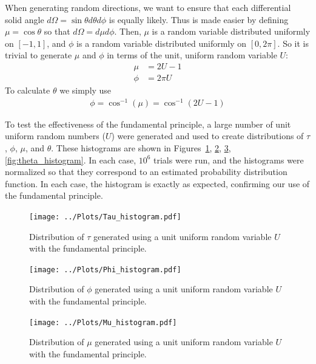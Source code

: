 \documentclass[twocolumn]{myarticle}
\begin{document}
When generating random directions, we want to ensure that each differential solid angle $ d \Omega = \sin \theta d \theta d \phi $ is equally likely.
Thus is made easier by defining $ \mu = \cos \theta $ so that $ d \Omega = d \mu d \phi $.
Then, $ \mu $ is a random variable distributed uniformly on $ [-1, 1] $, and $ \phi $ is a random variable distributed uniformly on $ [0, 2\pi] $.
So it is trivial to generate $ \mu $ and $ \phi $ in terms of the unit, uniform random variable $ U $:
\begin{align}
    \mu &= 2U - 1
    \\
    \phi &= 2\pi U
\end{align}
To calculate $ \theta $ we simply use
\begin{align}
    \phi = \cos^{-1} (\mu) = \cos^{-1}(2U-1) 
\end{align}

To test the effectiveness of the fundamental principle, a large number of unit uniform random numbers ($ U $) were generated and used to create distributions of $ \tau $, $ \phi $, $ \mu $, and $ \theta $.
These histograms are shown in Figures~\ref{fig:tau_histogram}, \ref{fig:phi_histogram}, \ref{fig:mu_histogram}, \ref{fig:theta_histogram}.
In each case, $ 10^6 $ trials were run, and the histograms were normalized so that they correspond to an estimated probability distribution function.
In each case, the histogram is exactly as expected, confirming our use of the fundamental principle.

\begin{figure}[ht!]
    \begin{center}
    \texttt{[image: ../Plots/Tau\_histogram.pdf]}
    \caption{%
        Distribution of $ \tau $ generated using a unit uniform random variable $ U $ with the fundamental principle.
    }
    \label{fig:tau_histogram}
    \end{center}
\end{figure}

\begin{figure}[ht!]
    \begin{center}
    \texttt{[image: ../Plots/Phi\_histogram.pdf]}
    \caption{%
        Distribution of $ \phi $ generated using a unit uniform random variable $ U $ with the fundamental principle.
    }
    \label{fig:phi_histogram}
    \end{center}
\end{figure}

\begin{figure}[ht!]
    \begin{center}
    \texttt{[image: ../Plots/Mu\_histogram.pdf]}
    \caption{%
        Distribution of $ \mu $ generated using a unit uniform random variable $ U $ with the fundamental principle.
    }
    \label{fig:mu_histogram}
    \end{center}
\end{figure}
\end{document}
